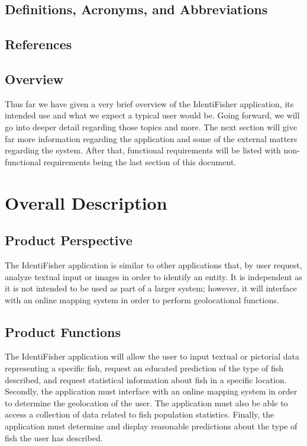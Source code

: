 \documentclass{article}
\begin{document}
\subsection{Definitions, Acronyms, and Abbreviations}

\iffalse
Anything can be added either by anyone on the team including myself, Chris.
\fi

\subsection{References}

\iffalse
Same goes for this, anything can be added as needed. I can cite if you wish.
\fi

\subsection{Overview}
Thus far we have given a very brief overview of the IdentiFisher application, its intended
use and what we expect a typical user would be. Going forward, we will go into deeper detail
regarding those topics and more. The next section will give far more information regarding
the application and some of the external matters regarding the system. After that, functional
requirements will be listed with non-functional requirements being the last section of this document.

\section{Overall Description}

\iffalse
This is still a rough draft of the overall desciption. If anyone would like to edit/add to this section, feel free.
\fi

\subsection{Product Perspective}

The IdentiFisher application is similar to other applications that, by user request, analyze textual input or images in order to identify an entity. It is independent as it is not intended to be used as part of a larger system; however, it will interface with an online mapping system in order to perform geolocational functions.  

\subsection{Product Functions}
The IdentiFisher application will allow the user to input textual or pictorial data representing a specific fish, request an educated prediction of the type of fish described, and request statistical information about fish in a specific location. Secondly, the application must interface with an online mapping system in order to determine the geolocation of the user. The application must also be able to access a collection of data related to fish population statistics. Finally, the application must determine and display reasonable predictions about the type of fish the user has described. 
\end{document}
